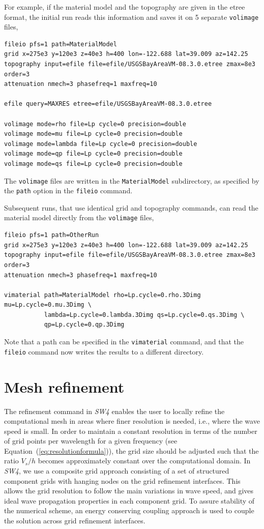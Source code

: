 \documentclass[11pt]{report}
\begin{document}
For example, if the material model and the topography are given in the etree format, the initial run
reads this information and saves it on 5 separate \verb+volimage+ files,
\begin{verbatim}
fileio pfs=1 path=MaterialModel
grid x=275e3 y=120e3 z=40e3 h=400 lon=-122.688 lat=39.009 az=142.25
topography input=efile file=efile/USGSBayAreaVM-08.3.0.etree zmax=8e3 order=3
attenuation nmech=3 phasefreq=1 maxfreq=10

efile query=MAXRES etree=efile/USGSBayAreaVM-08.3.0.etree 

volimage mode=rho file=Lp cycle=0 precision=double
volimage mode=mu file=Lp cycle=0 precision=double
volimage mode=lambda file=Lp cycle=0 precision=double
volimage mode=qp file=Lp cycle=0 precision=double
volimage mode=qs file=Lp cycle=0 precision=double
\end{verbatim}
The \verb+volimage+ files are written in the \verb+MaterialModel+ subdirectory, as specified by the
\verb+path+ option in the \verb+fileio+ command.

Subsequent runs, that use identical grid and topography commands, can read the material
model directly from the \verb+volimage+ files,
\begin{verbatim}
fileio pfs=1 path=OtherRun
grid x=275e3 y=120e3 z=40e3 h=400 lon=-122.688 lat=39.009 az=142.25
topography input=efile file=efile/USGSBayAreaVM-08.3.0.etree zmax=8e3 order=3
attenuation nmech=3 phasefreq=1 maxfreq=10

vimaterial path=MaterialModel rho=Lp.cycle=0.rho.3Dimg mu=Lp.cycle=0.mu.3Dimg \
           lambda=Lp.cycle=0.lambda.3Dimg qs=Lp.cycle=0.qs.3Dimg \
           qp=Lp.cycle=0.qp.3Dimg
\end{verbatim}
Note that a path can be specified in the \verb+vimaterial+ command, and that the \verb+fileio+
command now writes the results to a different directory.

\chapter{Mesh refinement} \label{sec:mesh-ref}
\index{mesh refinement}

The refinement command in \emph{SW4} enables the user to locally refine the computational mesh in
areas where finer resolution is needed, i.e., where the wave speed is small. In order to maintain a
constant resolution in terms of the number of grid points per wavelength for a given frequency (see
Equation~(\ref{eq:resolutionformula})), the grid size should be adjusted such that the ratio $V_s/h$
becomes approximately constant over the computational domain. In \emph{SW4}, we use a composite grid
approach consisting of a set of structured component grids with hanging nodes on the grid refinement
interfaces. This allows the grid resolution to follow the main variations in wave speed, and gives
ideal wave propagation properties in each component grid. To assure stability of the numerical
scheme, an energy conserving coupling approach is used to couple the solution across grid refinement
interfaces.
\end{document}
